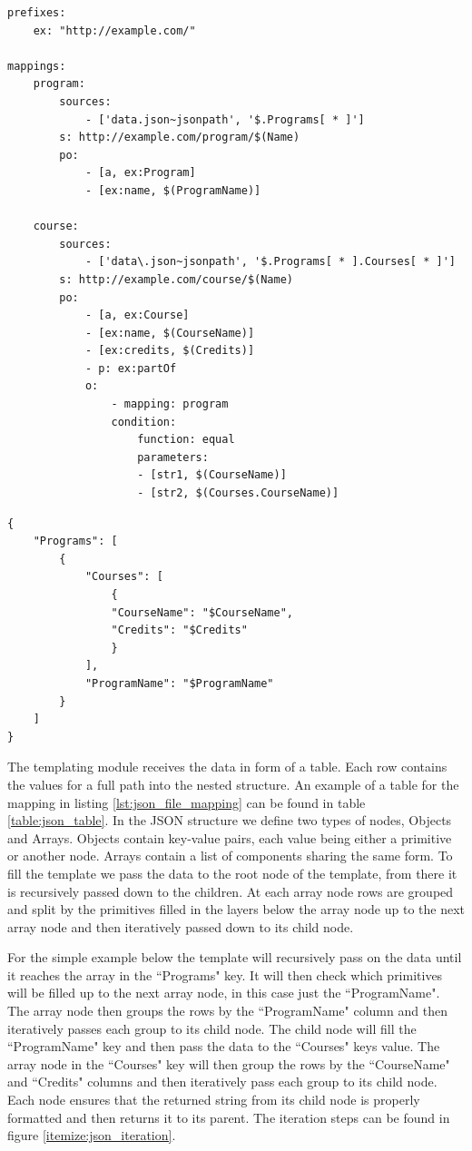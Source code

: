 \begin{lstlisting}[caption={Example YARRRML mapping for a JSON file}, label={lst:json_file_mapping}, captionpos=b, basicstyle=\small, frame=single]
prefixes:
    ex: "http://example.com/"

mappings:
    program:
        sources:
            - ['data.json~jsonpath', '$.Programs[ * ]']
        s: http://example.com/program/$(Name)
        po:
            - [a, ex:Program]
            - [ex:name, $(ProgramName)]

    course:
        sources:
            - ['data\.json~jsonpath', '$.Programs[ * ].Courses[ * ]']
        s: http://example.com/course/$(Name)
        po:
            - [a, ex:Course]
            - [ex:name, $(CourseName)]
            - [ex:credits, $(Credits)]
            - p: ex:partOf
            o: 
                - mapping: program
                condition: 
                    function: equal
                    parameters:
                    - [str1, $(CourseName)]
                    - [str2, $(Courses.CourseName)]
\end{lstlisting}

\begin{lstlisting}[caption={Example JSON template}, label={lst:json_template}, captionpos=b, basicstyle=\small, frame=single]
{
    "Programs": [
        {
            "Courses": [
                {
                "CourseName": "$CourseName",
                "Credits": "$Credits"
                }
            ],
            "ProgramName": "$ProgramName"
        }
    ]
}
\end{lstlisting}

The templating module receives the data in form of a table. Each row contains the values for a full path into the nested structure. An example of a table for the mapping in listing \ref{lst:json_file_mapping} can be found in table \ref{table:json_table}. In the JSON structure we define two types of nodes, Objects and Arrays. Objects contain key-value pairs, each value being either a primitive or another node. Arrays contain a list of components sharing the same form. To fill the template we pass the data to the root node of the template, from there it is recursively passed down to the children. At each array node rows are grouped and split by the primitives filled in the layers below the array node up to the next array node and then iteratively passed down to its child node.

For the simple example below the template will recursively pass on the data until it reaches the array in the ``Programs" key. It will then check which primitives will be filled up to the next array node, in this case just the ``ProgramName". The array node then groups the rows by the ``ProgramName" column and then iteratively passes each group to its child node. The child node will fill the ``ProgramName" key and then pass the data to the ``Courses" keys value. The array node in the ``Courses" key will then group the rows by the ``CourseName" and ``Credits" columns and then iteratively pass each group to its child node. Each node ensures that the returned string from its child node is properly formatted and then returns it to its parent. The iteration steps can be found in figure \ref{itemize:json_iteration}.

